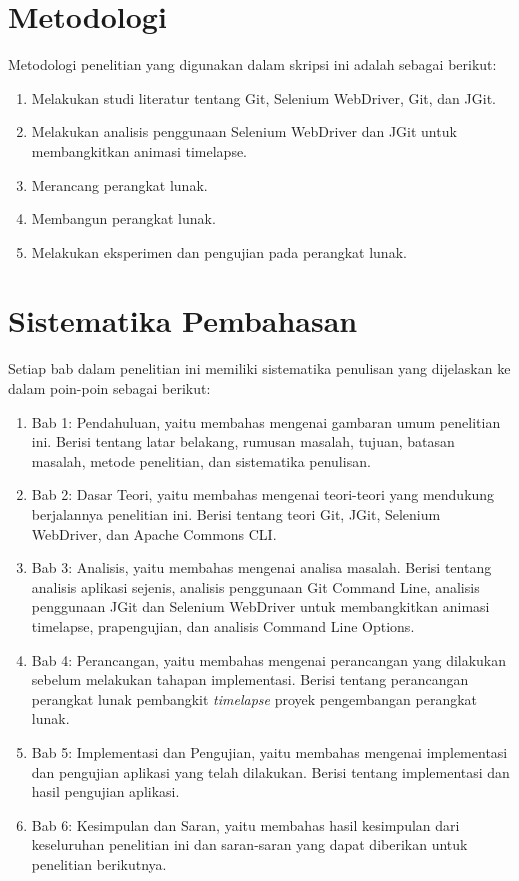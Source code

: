 \section{Metodologi}
\label{sec:metlit}
Metodologi penelitian yang digunakan dalam skripsi ini adalah sebagai berikut:
\begin{enumerate}
		\item Melakukan studi literatur tentang Git, Selenium WebDriver, Git, dan JGit.
		\item Melakukan analisis penggunaan Selenium WebDriver dan JGit untuk membangkitkan animasi timelapse.
		\item Merancang perangkat lunak.
		\item Membangun perangkat lunak.
		\item Melakukan eksperimen dan pengujian pada perangkat lunak.
	\end{enumerate}

\section{Sistematika Pembahasan}
\label{sec:sispem}
Setiap bab dalam penelitian ini memiliki sistematika penulisan yang dijelaskan ke dalam poin-poin sebagai berikut:
\begin{enumerate}
		\item Bab 1: Pendahuluan, yaitu membahas mengenai gambaran umum penelitian ini. Berisi tentang latar belakang, rumusan masalah, tujuan, batasan masalah, metode penelitian, dan sistematika penulisan.
		\item Bab 2: Dasar Teori, yaitu membahas mengenai teori-teori yang mendukung berjalannya penelitian ini. Berisi tentang teori Git, JGit, Selenium WebDriver, dan Apache Commons CLI.
		\item Bab 3: Analisis, yaitu membahas mengenai analisa masalah. Berisi tentang analisis aplikasi sejenis, analisis penggunaan Git Command Line, analisis penggunaan JGit dan Selenium WebDriver untuk membangkitkan animasi timelapse, prapengujian, dan analisis Command Line Options.
		\item Bab 4: Perancangan, yaitu membahas mengenai perancangan yang dilakukan sebelum melakukan tahapan implementasi. Berisi tentang perancangan perangkat lunak pembangkit \textit{timelapse} proyek pengembangan perangkat lunak.
		\item Bab 5: Implementasi dan Pengujian, yaitu membahas mengenai implementasi dan pengujian aplikasi yang telah dilakukan. Berisi tentang implementasi dan hasil pengujian aplikasi.
		\item Bab 6: Kesimpulan dan Saran, yaitu membahas hasil kesimpulan dari keseluruhan penelitian ini dan saran-saran yang dapat diberikan untuk penelitian berikutnya.
	\end{enumerate}
